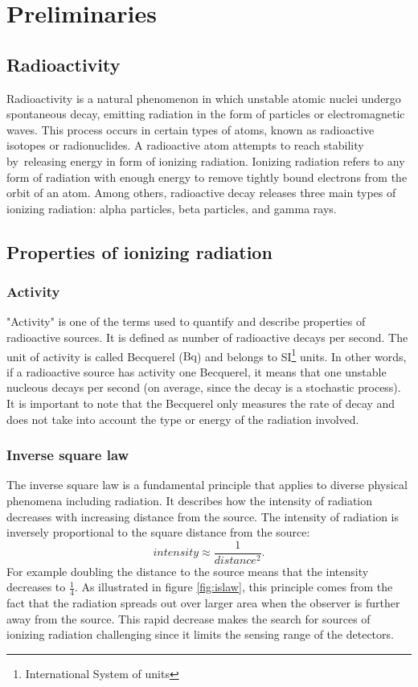
\chapter{Preliminaries\label{chap:preliminaries}}

\section{Radioactivity}
Radioactivity is a natural phenomenon in which unstable atomic nuclei undergo spontaneous decay, emitting radiation in the form of particles or electromagnetic waves. 
This process occurs in certain types of atoms, known as radioactive isotopes or radionuclides. 
A radioactive atom attempts to reach stability by releasing energy in form of ionizing radiation.
Ionizing radiation refers to any form of radiation with enough energy to remove tightly bound electrons from the orbit of an atom.
Among others, radioactive decay releases three main types of ionizing radiation: alpha particles, beta particles, and gamma rays. 


\section{Properties of ionizing radiation}
\subsection{Activity}%
"Activity" is one of the terms used to quantify and describe properties of radioactive sources.
It is defined as number of radioactive decays per second.
The unit of activity is called Becquerel ($\si{\becquerel}$) and belongs to SI\footnote{International System of units} units.
In other words, if a radioactive source has activity one Becquerel, it means that one unstable nucleous decays per second (on average, since the decay is a stochastic process).
It is important to note that the Becquerel only measures the rate of decay and does not take into account the type or energy of the radiation involved.%

  \subsection{Inverse square law}%
The inverse square law is a fundamental principle that applies to diverse physical phenomena including radiation.
It describes how the intensity of radiation decreases with increasing distance from the source.
The intensity of radiation is inversely proportional to the square distance from the source:
\begin{equation}
  intensity \approx \frac{1}{distance^2}.
\end{equation}
For example doubling the distance to the source means that the intensity decreases to $\frac{1}{4}$.
As illustrated in figure \ref{fig:islaw}, this principle comes from the fact that the radiation spreads out over larger area when the observer is further away from the source.
This rapid decrease makes the search for sources of ionizing radiation challenging since it limits the sensing range of the detectors.

